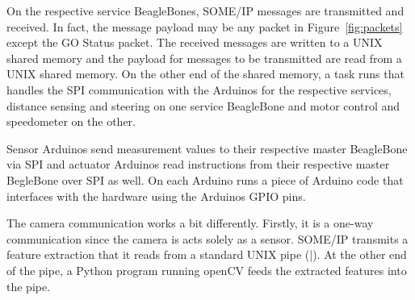 \documentclass[11pt, titlepage]{article} %
\begin{document}
On the respective service BeagleBones, SOME/IP messages are transmitted and received. In fact, the message
payload may be any packet in Figure~\ref{fig:packets} except the GO Status packet. The received messages
are written to a UNIX shared memory and the payload for messages to be transmitted are read from a UNIX
shared memory. On the other end of the shared memory, a task runs that handles the SPI communication
with the Arduinos for the respective services, distance sensing and steering on one service BeagleBone and
motor control and speedometer on the other.

Sensor Arduinos send measurement values to their respective master BeagleBone via SPI and actuator Arduinos
read instructions from their respective master BegleBone over SPI as well. On each Arduino runs a piece
of Arduino code that interfaces with the hardware using the Arduinos GPIO pins.

The camera communication works a bit differently. Firstly, it is a one-way communication since the camera
is acts solely as a sensor. SOME/IP transmits a feature extraction that it reads from a standard UNIX
pipe (|). At the other end of the pipe, a Python program running openCV feeds the extracted features
into the pipe.
\end{document}
